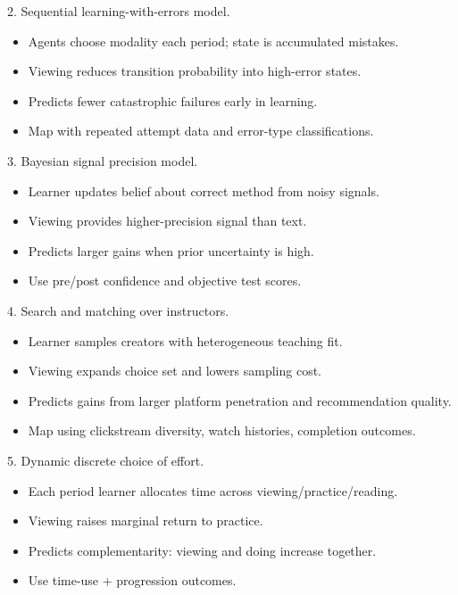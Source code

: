 \documentclass[11pt]{article}
\begin{document}
2. Sequential learning-with-errors model.\\
\begin{itemize}
\item Agents choose modality each period; state is accumulated mistakes.
\item Viewing reduces transition probability into high-error states.
\item Predicts fewer catastrophic failures early in learning.
\item Map with repeated attempt data and error-type classifications.
\end{itemize}

3. Bayesian signal precision model.\\
\begin{itemize}
\item Learner updates belief about correct method from noisy signals.
\item Viewing provides higher-precision signal than text.
\item Predicts larger gains when prior uncertainty is high.
\item Use pre/post confidence and objective test scores.
\end{itemize}

4. Search and matching over instructors.\\
\begin{itemize}
\item Learner samples creators with heterogeneous teaching fit.
\item Viewing expands choice set and lowers sampling cost.
\item Predicts gains from larger platform penetration and recommendation quality.
\item Map using clickstream diversity, watch histories, completion outcomes.
\end{itemize}

5. Dynamic discrete choice of effort.\\
\begin{itemize}
\item Each period learner allocates time across viewing/practice/reading.
\item Viewing raises marginal return to practice.
\item Predicts complementarity: viewing and doing increase together.
\item Use time-use + progression outcomes.
\end{itemize}
\end{document}
